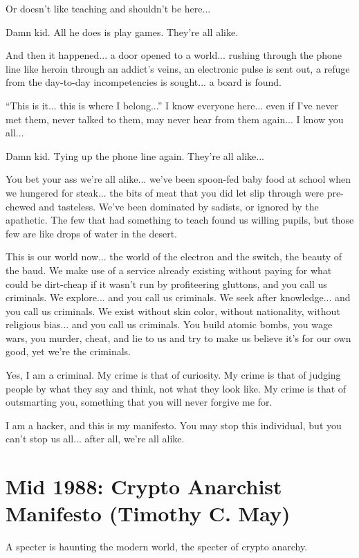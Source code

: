 \documentclass[letterpaper,12pt,english]{sphinxmanual}
\begin{document}
Or doesn't like teaching and shouldn't be here...

Damn kid. All he does is play games. They're all alike.

And then it happened... a door opened to a world... rushing through the phone line like heroin through an addict's veins, an electronic pulse is sent out, a refuge from the day-to-day incompetencies is sought... a board is found.

``This is it... this is where I belong...''
I know everyone here... even if I've never met them, never talked to them, may never hear from them again... I know you all...

Damn kid. Tying up the phone line again. They're all alike...

You bet your ass we're all alike... we've been spoon-fed baby food at school when we hungered for steak... the bits of meat that you did let slip through were pre-chewed and tasteless. We've been dominated by sadists, or ignored by the apathetic. The few that had something to teach found us willing pupils, but those few are like drops of water in the desert.

This is our world now... the world of the electron and the switch, the beauty of the baud. We make use of a service already existing without paying for what could be dirt-cheap if it wasn't run by profiteering gluttons, and you call us criminals. We explore... and you call us criminals. We seek after knowledge... and you call us criminals. We exist without skin color, without nationality, without religious bias... and you call us criminals. You build atomic bombs, you wage wars, you murder, cheat, and lie to us and try to make us believe it's for our own good, yet we're the criminals.

Yes, I am a criminal. My crime is that of curiosity. My crime is that of judging people by what they say and think, not what they look like. My crime is that of outsmarting you, something that you will never forgive me for.

I am a hacker, and this is my manifesto. You may stop this individual, but you can't stop us all... after all, we're all alike.


\chapter{Mid 1988: Crypto Anarchist Manifesto (Timothy C. May)}
\label{1988:mid-1988-crypto-anarchist-manifesto-timothy-c-may}\label{1988::doc}\label{1988:index-0}
A specter is haunting the modern world, the specter of crypto anarchy.
\end{document}
